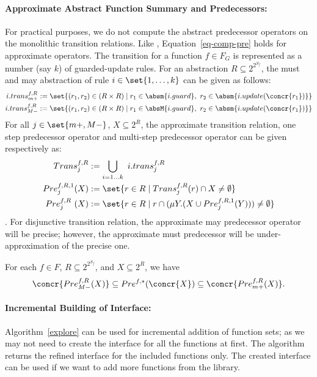 \documentclass{llncs}
\begin{document}
\paragraph{Approximate Abstract Function Summary and Predecessors:} For practical purposes, we do not compute the abstract predecessor operators on the monolithic transition relations.
Like \cite{dAR07concur}, Equation~\ref{eq-comp-pre} holds for approximate operators.
The transition for a function $f \in F_G$ is represented as a number (say $k$) of guarded-update rules. 
For an abstraction $R \subseteq 2^{2^{S_f}}$, the must and may abstraction of rule 
$i \in \set{1,\ldots,k}$ can be given as follows:
\begin{align*}
  i.trans^{f,R}_{m+}  & := \set{ (r_1, r_2) \in (R \times R) \mid r_1 \in \absm{i.guard},\  r_2 \in \absm{i.update(\concr{r_1})}}\\
  i.trans^{f,R}_{M-}  & := \set{ (r_1, r_2) \in (R \times R) \mid r_1 \in \absM{i.guard},\ r_2 \in \absm{i.update(\concr{r_1})}}
\end{align*}
For all $j \in \set{m+,M-}$, $X \subseteq 2^R$, the approximate transition relation, one step predecessor operator and multi-step predecessor operator
can be given respectively as:
\begin{align*}
  Trans^{f,R}_{j} & := \bigcup_{i=1 \ldots k}  \   i.trans^{f,R}_{j}\\
Pre^{f,R,1}_{j}(X) & :=  \set{ r \in R \mid Trans^{f,R}_{j}(r) \cap X \neq \emptyset} \\
Pre^{f,R}_{j}\ (X) & :=  \set{ r \in R \mid r \cap (\mu Y. ( X \cup Pre^{f,R,1}_{j}(Y))) \neq \emptyset}\\
\end{align*}
.
For disjunctive transition relation, the approximate may predecessor operator will be precise; however, the approximate must predecessor will be under-approximation of the precise one.
\begin{theorem}
\label{theo-pre-approx}
For each $f \in F$, $R \subseteq 2^{2^{S_f}}$, and $X \subseteq 2^R$, we have
\[
\concr{Pre^{f,R}_{M-}(X)} \subseteq Pre^{f,*} (\concr{X}) \subseteq \concr{Pre^{f,R}_{m+}(X)}.  
\]
\end{theorem}

\paragraph{Incremental Building of Interface:} Algorithm~\ref{explore} can be used for incremental addition of function sets;  as we may not need to create the interface for all the functions at first.
The algorithm returns the refined interface for the included functions only.
The created interface can be used if we want to add more functions from the library.
\end{document}
